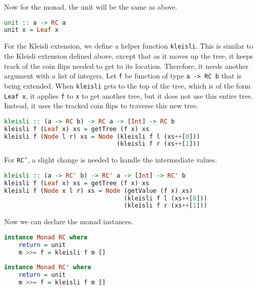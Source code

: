 Now for the monad, the unit will be the same as above.
\begin{lstlisting}[language=Haskell]
unit :: a -> RC a
unit x = Leaf x
\end{lstlisting}
For the Kleisli extension, we define a helper function \texttt{kleisli}.  This is similar to the Kleisli extension defined above, except that as it moves up the tree, it keeps track of the coin flips needed to get to its location.  Therefore, it needs another argument with a list of integers.  Let \texttt{f} be function of type \texttt{a -> RC b} that is being extended.  When \texttt{kleisli} gets to the top of the tree, which is of the form \texttt{Leaf x}, it applies \texttt{f} to \texttt{x} to get another tree, but it does not use this entire tree.  Instead, it uses the tracked coin flips to traverse this new tree. 
\begin{lstlisting}[language=Haskell]
kleisli :: (a -> RC b) -> RC a -> [Int] -> RC b
kleisli f (Leaf x) xs = getTree (f x) xs
kleisli f (Node l r) xs = Node (kleisli f l (xs++[0])) 
                               (kleisli f r (xs++[1]))
\end{lstlisting}
For \texttt{RC'}, a slight change is needed to handle the intermediate values.
\begin{lstlisting}[language=Haskell]
kleisli :: (a -> RC' b) -> RC' a -> [Int] -> RC' b
kleisli f (Leaf x) xs = getTree (f x) xs
kleisli f (Node x l r) xs = Node (getValue (f x) xs)
                                 (kleisli f l (xs++[0])) 
                                 (kleisli f r (xs++[1]))
\end{lstlisting}
Now we can declare the monad instances.
\newpage
\begin{lstlisting}[language=Haskell]
instance Monad RC where
	return = unit
	m >>= f = kleisli f m []
	
instance Monad RC' where
	return = unit
	m >>= f = kleisli f m []
\end{lstlisting}

